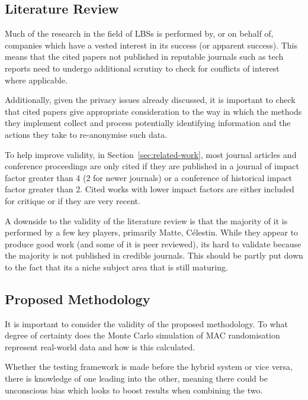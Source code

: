 
\subsection{Literature Review}\label{sec:lit-review-validity}

Much of the research in the field of LBSs is performed by, or on behalf of, companies which have a vested interest in its success (or apparent success).
This means that the cited papers not published in reputable journals such as tech reports need to undergo additional scrutiny to check for conflicts of interest where applicable.

Additionally, given the privacy issues already discussed, it is important to check that cited papers give appropriate consideration to the way in which the methods they implement collect and process potentially identifying information and the actions they take to re-anonymise such data.

To help improve validity, in Section~\ref{sec:related-work}, most journal articles and conference proceedings are only cited if they are published in a journal of impact factor greater than 4 (2 for newer journals) or a conference of historical impact factor greater than 2.
Cited works with lower impact factors are either included for critique or if they are very recent.

A downside to the validity of the literature review is that the majority of it is performed by a few key players, primarily Matte, C{\'e}lestin.
While they appear to produce good work (and some of it is peer reviewed), its hard to validate because the majority is not published in credible journals.
This should be partly put down to the fact that its a niche subject area that is still maturing.

\subsection{Proposed Methodology}\label{sec:methodology-validity}

It is important to consider the validity of the proposed methodology.
To what degree of certainty does the Monte Carlo simulation of MAC randomisation represent real-world data and how is this calculated.

Whether the testing framework is made before the hybrid system or vice versa, there is knowledge of one leading into the other, meaning there could be unconscious bias which looks to boost results when combining the two.


